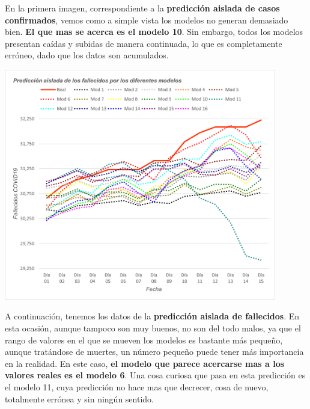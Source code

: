 \documentclass[12pt,a4paper, xcolor=table]{article}
\begin{document}
            En la primera imagen, correspondiente a la \textbf{predicción aislada de casos confirmados}, vemos como a simple vista los modelos no generan demasiado bien. \textbf{El que mas se acerca es el modelo 10}. Sin embargo, todos los modelos presentan caídas y subidas de manera continuada, lo que es completamente erróneo, dado que los datos son acumulados.
            
            \begin{center}
                \centering
                \includegraphics[width=450px]{img/pred_a_fall_ES.png}
            \end{center}
            
            A continuación, tenemos los datos de la \textbf{predicción aislada de fallecidos}. En esta ocasión, aunque tampoco son muy buenos, no son del todo malos, ya que el rango de valores en el que se mueven los modelos es bastante más pequeño, aunque tratándose de muertes, un número pequeño puede tener más importancia en la realidad. En este caso, \textbf{el modelo que parece acercarse mas a los valores reales es el modelo 6}. Una cosa curiosa que pasa en esta predicción es el modelo 11, cuya predicción no hace mas que decrecer, cosa de nuevo, totalmente errónea y sin ningún sentido.
            
\end{document}
